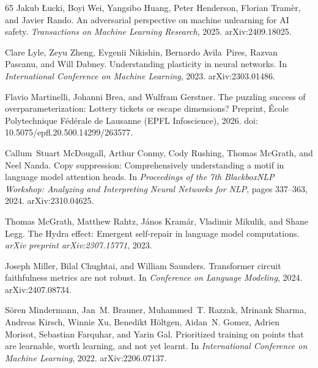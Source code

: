 \begin{thebibliography}{65}
Jakub {\L}ucki, Boyi Wei, Yangsibo Huang, Peter Henderson, Florian Tram{\`e}r, and Javier Rando.
\newblock An adversarial perspective on machine unlearning for AI safety.
\newblock \emph{Transactions on Machine Learning Research}, 2025.
\newblock arXiv:2409.18025.

Clare Lyle, Zeyu Zheng, Evgenii Nikishin, Bernardo Avila~Pires, Razvan Pascanu, and Will Dabney.
\newblock Understanding plasticity in neural networks.
\newblock In \emph{International Conference on Machine Learning}, 2023.
\newblock arXiv:2303.01486.

Flavio Martinelli, Johanni Brea, and Wulfram Gerstner.
\newblock The puzzling success of overparameterization: Lottery tickets or escape dimensions?
\newblock Preprint, {\'E}cole Polytechnique F{\'e}d{\'e}rale de Lausanne (EPFL Infoscience), 2026.
\newblock doi: 10.5075/epfl.20.500.14299/263577.

Callum~Stuart McDougall, Arthur Conmy, Cody Rushing, Thomas McGrath, and Neel Nanda.
\newblock Copy suppression: Comprehensively understanding a motif in language model attention heads.
\newblock In \emph{Proceedings of the 7th BlackboxNLP Workshop: Analyzing and Interpreting Neural Networks for NLP}, pages 337--363, 2024.
\newblock arXiv:2310.04625.

Thomas McGrath, Matthew Rahtz, J{\'a}nos Kram{\'a}r, Vladimir Mikulik, and Shane Legg.
\newblock The Hydra effect: Emergent self-repair in language model computations.
\newblock \emph{arXiv preprint arXiv:2307.15771}, 2023.

Joseph Miller, Bilal Chughtai, and William Saunders.
\newblock Transformer circuit faithfulness metrics are not robust.
\newblock In \emph{Conference on Language Modeling}, 2024.
\newblock arXiv:2407.08734.

S{\"o}ren Mindermann, Jan~M. Brauner, Muhammed~T. Razzak, Mrinank Sharma,
  Andreas Kirsch, Winnie Xu, Benedikt H{\"o}ltgen, Aidan~N. Gomez, Adrien
  Morisot, Sebastian Farquhar, and Yarin Gal.
\newblock Prioritized training on points that are learnable, worth learning,
  and not yet learnt.
\newblock In \emph{International Conference on Machine Learning}, 2022.
\newblock arXiv:2206.07137.


\end{thebibliography}
